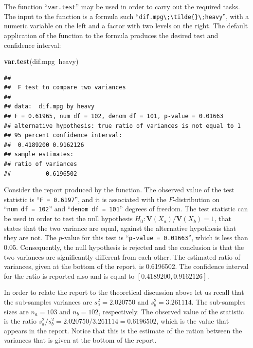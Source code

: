 \documentclass[
]{krantz}
\makeatletter
\newenvironment{Shaded}{\begin{snugshade}}{\end{snugshade}}
\newcommand{\KeywordTok}[1]{\textcolor[rgb]{0.13,0.29,0.53}{\textbf{#1}}}
\newcommand{\NormalTok}[1]{#1}
\newcommand{\OperatorTok}[1]{\textcolor[rgb]{0.81,0.36,0.00}{\textbf{#1}}}
\newcommand{\Var}{\mathbf{V}}
\newenvironment{kframe}{%
\medskip{}
\setlength{\fboxsep}{.8em}
 \def\at@end@of@kframe{}%
 \ifinner\ifhmode%
  \def\at@end@of@kframe{\end{minipage}}%
  \begin{minipage}{\columnwidth}%
 \fi\fi%
 \def\FrameCommand##1{\hskip\@totalleftmargin \hskip-\fboxsep
 \colorbox{shadecolor}{##1}\hskip-\fboxsep
     \hskip-\linewidth \hskip-\@totalleftmargin \hskip\columnwidth}%
 \MakeFramed {\advance\hsize-\width
   \@totalleftmargin\z@ \linewidth\hsize
   \@setminipage}}%
 {\par\unskip\endMakeFramed%
 \at@end@of@kframe}
\renewenvironment{Shaded}{\begin{kframe}}{\end{kframe}}
\theoremstyle{definition}
\theoremstyle{definition}
\theoremstyle{definition}
\theoremstyle{remark}
\makeatother
\begin{document}
The function ``\texttt{var.test}'' may be used in order to carry out the required
tasks. The input to the function is a formula such
``\texttt{dif.mpg\textbackslash{};\textbackslash{}tilde\{\}\textbackslash{};heavy}'', with a numeric variable on the left and a
factor with two levels on the right. The default application of the
function to the formula produces the desired test and confidence
interval:

\begin{Shaded}
\begin{Highlighting}[]
\KeywordTok{var.test}\NormalTok{(dif.mpg}\OperatorTok{~}\NormalTok{heavy)}
\end{Highlighting}
\end{Shaded}

\begin{verbatim}
## 
##  F test to compare two variances
## 
## data:  dif.mpg by heavy
## F = 0.61965, num df = 102, denom df = 101, p-value = 0.01663
## alternative hypothesis: true ratio of variances is not equal to 1
## 95 percent confidence interval:
##  0.4189200 0.9162126
## sample estimates:
## ratio of variances 
##          0.6196502
\end{verbatim}

Consider the report produced by the function. The observed value of the
test statistic is ``\texttt{F\ =\ 0.6197}'', and it is associated with the
\(F\)-distribution on ``\texttt{num\ df\ =\ 102}'' and ``\texttt{denom\ df\ =\ 101}'' degrees of
freedom. The test statistic can be used in order to test the null
hypothesis \(H_0: \Var(X_a)/\Var(X_b) = 1\), that states that the two
variance are equal, against the alternative hypothesis that they are
not. The \(p\)-value for this test is ``\texttt{p-value\ =\ 0.01663}'', which is less
than 0.05. Consequently, the null hypothesis is rejected and the
conclusion is that the two variances are significantly different from
each other. The estimated ratio of variances, given at the bottom of the
report, is 0.6196502. The confidence interval for the ratio is reported
also and is equal to \([0.4189200, 0.9162126]\).

In order to relate the report to the theoretical discussion above let us
recall that the sub-samples variances are \(s^2_a = 2.020750\) and
\(s_b^2 = 3.261114\). The sub-samples sizes are \(n_a = 103\) and
\(n_b = 102\), respectively. The observed value of the statistic is the
ratio \(s_a^2/s_b^2 = 2.020750/3.261114 = 0.6196502\), which is the value
that appears in the report. Notice that this is the estimate of the
ration between the variances that is given at the bottom of the report.
\end{document}
